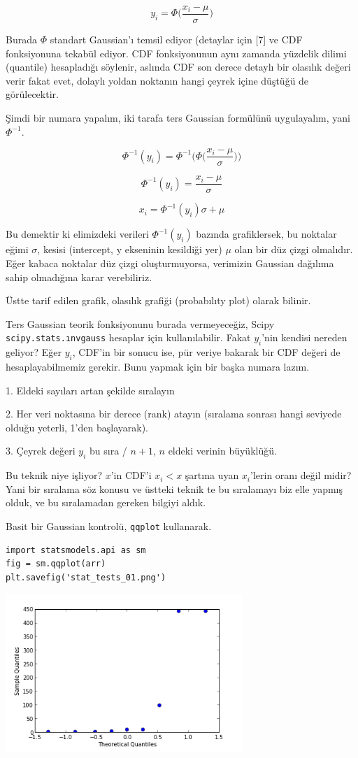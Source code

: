 \documentclass[12pt,fleqn]{article}\usepackage{../../common}
\begin{document}
$$ y_i = \Phi\bigg(\frac{ x_i - \mu}{\sigma}\bigg) $$

Burada $\Phi$ standart Gaussian'ı temsil ediyor (detaylar için [7] ve CDF
fonksiyonuna tekabül ediyor. CDF fonksiyonunun aynı zamanda yüzdelik dilimi
(quantile) hesapladığı söylenir, aslında CDF son derece detaylı bir
olasılık değeri verir fakat evet, dolaylı yoldan noktanın hangi çeyrek
içine düştüğü de görülecektir.

Şimdi bir numara yapalım, iki tarafa ters Gaussian formülünü uygulayalım,
yani $\Phi^{-1}$.

$$ \Phi^{-1}(y_i) = \Phi^{-1}\bigg( \Phi\bigg(\frac{ x_i - \mu}{\sigma}\bigg)\bigg) $$

$$ \Phi^{-1}(y_i) = \frac{ x_i - \mu}{\sigma}$$

$$ x_i = \Phi^{-1}(y_i) \sigma + \mu  $$ 

Bu demektir ki elimizdeki verileri $\Phi^{-1}(y_i)$ bazında grafiklersek,
bu noktalar eğimi $\sigma$, kesisi (intercept, y ekseninin kesildiği yer)
$\mu$ olan bir düz çizgi olmalıdır. Eğer kabaca noktalar düz çizgi
oluşturmuyorsa, verimizin Gaussian dağılıma sahip olmadığına karar
verebiliriz.

Üstte tarif edilen grafik,  olasılık grafiği (probabılıty plot) olarak
bilinir. 

Ters Gaussian teorik fonksiyonunu burada vermeyeceğiz, Scipy
\verb!scipy.stats.ınvgauss! hesaplar için kullanılabilir. Fakat $y_i$'nin
kendisi nereden geliyor? Eğer $y_i$, CDF'in bir sonucu ise, pür veriye
bakarak bir CDF değeri de hesaplayabilmemiz gerekir. Bunu yapmak için bir
başka numara lazım. 

1. Eldeki sayıları artan şekilde sıralayın

2. Her veri noktasına bir derece (rank) atayın (sıralama sonrası hangi
seviyede olduğu yeterli, 1'den başlayarak). 

3. Çeyrek değeri $y_i$ bu sıra / $n+1$, $n$ eldeki verinin büyüklüğü. 

Bu teknik niye işliyor? $x$'in CDF'i $x_i < x$ şartına uyan $x_i$'lerin
oranı değil midir? Yani bir sıralama söz konusu ve üstteki teknik te bu
sıralamayı biz elle yapmış olduk, ve bu sıralamadan gereken bilgiyi aldık. 

Basit bir Gaussian kontrolü, \verb!qqplot! kullanarak. 

\begin{verbatim}
import statsmodels.api as sm
fig = sm.qqplot(arr)
plt.savefig('stat_tests_01.png')
\end{verbatim}
\includegraphics[height=6cm]{stat_tests_01.png}
\end{document}
